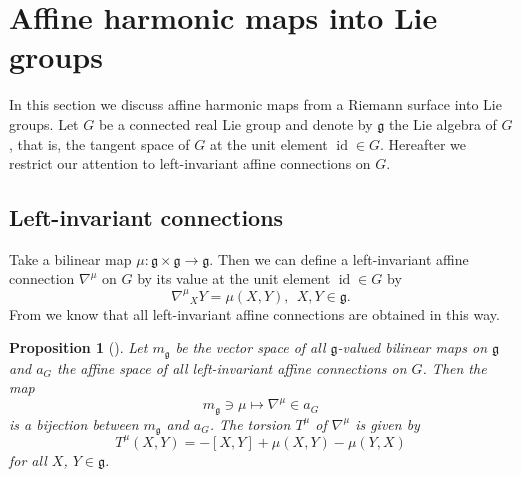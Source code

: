 \documentclass[12pt]{amsart}
\newtheorem{Proposition}[Theorem]{Proposition}
\theoremstyle{definition}
\theoremstyle{remark}
\numberwithin{equation}{section}
\begin{document}
\section{Affine harmonic maps into Lie groups}\label{sc:affineLiegroup}
 In this section we discuss affine harmonic maps 
 from a Riemann surface into Lie groups.
 Let $G$ be a connected real Lie group
 and denote by $\mathfrak{g}$ 
 the Lie algebra of $G$, that is, 
 the tangent space of $G$ at the unit element ${\operatorname{id}} \in G$. 
 Hereafter we restrict our attention to left-invariant affine 
 connections on $G$. 
\subsection{Left-invariant connections} 
 Take a bilinear map 
 $\mu:\mathfrak{g}\times \mathfrak{g}\to \mathfrak{g}$.
 Then we can define a left-invariant affine 
 connection ${\nabla^{\mu}}$ on $G$ by its value at the unit element ${\operatorname{id}} \in G$ by
\begin{equation*}
{\nabla^{\mu}}_{X}Y=\mu(X,Y), \ \ X,Y
\in \mathfrak{g}.
\end{equation*}
 From \cite{Nomizu} we know that all left-invariant affine connections are obtained in this 
 way.
\begin{Proposition}[\cite{Nomizu}]\label{allconnections}
 Let $m_\mathfrak{g}$ be the vector 
 space of all $\mathfrak{g}$-valued 
 bilinear maps on $\mathfrak{g}$ and 
 $a_G$ the affine space of all 
 left-invariant affine connections on $G$.
 Then the map
\begin{equation*}
 m_{\mathfrak g}\ni \mu\longmapsto {\nabla^{\mu}} \in a_G 
\end{equation*}
 is a bijection between $m_{\mathfrak g}$ 
 and $a_G$. The torsion $T^\mu$ of ${\nabla^{\mu}}$ 
 is given by
\begin{equation}\label{eq:torsionformu}
T^{\mu}(X,Y)=-[X,Y]+\mu(X,Y)-\mu(Y,X)
\end{equation}
 for all $X$, $Y\in \mathfrak{g}$.
\end{Proposition}
\end{document}
